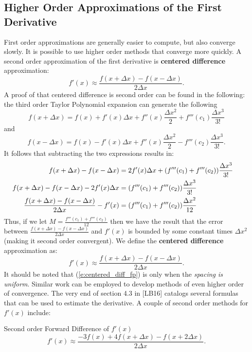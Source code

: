 \documentclass[twoside]{article}
\renewcommand{\cite}[1]{[#1]}
\def\ds{\displaystyle}
\begin{document}
\subsection{Higher Order Approximations of the First Derivative}
First order approximations are generally easier to compute, but also converge slowly. It is possible to use higher order methods that converge more quickly. A second order approximation of the first derivative is {\bf centered difference} approximation:
\begin{equation}
    f'(x) \approx \frac {f(x+\Delta x)-f(x-\Delta x)}{2 \Delta x} .
    \label{e:centered_diff}
\end{equation}
A proof of that centered difference is second order can be found in the following:
the third order Taylor Polynomial expansion can generate the following
$$f(x + \Delta x) = f(x) + f'(x) \Delta x + f''(x) \frac {\Delta x^2}2 + f'''(c_1) \frac {\Delta x^3}{3!}$$
and
$$f(x - \Delta x) = f(x) - f'(x) \Delta x + f''(x) \frac {\Delta x^2}2 - f'''(c_2) \frac {\Delta x^3}{3!}.$$
It follows that subtracting the two expressions results in:
\begin{align*}
 f(x + \Delta x)- f(x - \Delta x) &= 2f'(x)\Delta x + (f'''(c_1)+f'''(c_2)) \frac {\Delta x^3}{3!}  \cr
  f(x + \Delta x)- f(x - \Delta x) - 2f'(x)\Delta x &=   (f'''(c_1)+f'''(c_2)) \frac {\Delta x^3}{3!} \cr
\frac {f(x + \Delta x)- f(x - \Delta x)}{2 \Delta x} - f'(x) &=   (f'''(c_1)+f'''(c_2)) \frac {\Delta x^2}{12}
\end{align*}
Thus, if we let $M = \frac {f'''(c_1)+f'''(c_2)}{12}$ then we have the result that the error between $\ds \frac {f(x + \Delta x)- f(x - \Delta x)}{2 \Delta x}$ and $f'(x)$ is bounded by some constant times $\Delta x^2$ (making it second order convergent). We define the {\bf centered difference} approximation as:
\begin{equation}
f'(x) \approx \frac {f(x + \Delta x)- f(x - \Delta x)}{2 \Delta x}.    
\label{e:centered_diff_fp}
\end{equation}
It should be noted that (\ref{e:centered_diff_fp}) is only when the {\it spacing is uniform}. Similar work can be employed to develop methods of even higher order of convergence. The very end of section 4.3 in \cite{LB16} catalogs several formulas that can be used to estimate the derivative. A couple of second order methods for $\ds f'(x)$ include:

Second order Forward Difference of $\ds f'(x)$
$$f'(x) \approx \frac {-3f(x) + 4f(x + \Delta x) - f(x+2 \Delta x)}{2\Delta x}.$$
\end{document}
